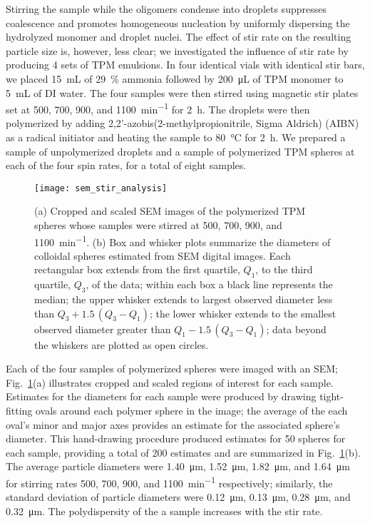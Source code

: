 Stirring the sample while the oligomers condense into droplets suppresses coalescence and
promotes homogeneous nucleation by uniformly dispersing the hydrolyzed monomer and droplet
nuclei. %
The effect of stir rate on the resulting particle size is, however, less clear;
we investigated the influence of stir rate by producing \num{4} sets of TPM emulsions.
In four identical vials with identical stir bars, we placed \SI{15}{\milli\liter} of 
\SI{29}{\percent} ammonia followed by \SI{200}{\micro\liter} of TPM 
monomer to \SI{5}{\milli\liter} of DI water. The four samples were then stirred 
using magnetic stir plates set at \num{500}, \num{700}, \num{900}, and
\SI{1100}{\minute^{-1}} for \SI{2}{\hour}. 
The droplets were then polymerized by adding
\num{2},\num{2}'-azobis(\num{2}-methylpropionitrile, Sigma Aldrich) (AIBN)
as a radical initiator and %
heating the sample to \SI{80}{\celsius} for \SI{2}{\hour}.
We prepared a sample of unpolymerized droplets and a sample of polymerized TPM spheres
at each of the four spin rates, for a total of eight samples.

\begin{figure}
    \centering
    \texttt{[image: sem\_stir\_analysis]}
    \caption{(a) Cropped and scaled SEM images of the polymerized TPM spheres whose
      samples were stirred at \num{500}, \num{700}, \num{900}, and \SI{1100}{\minute^{-1}}.
      (b)  Box and whisker plots summarize the diameters of colloidal spheres estimated from
      SEM digital images. Each rectangular box extends from the first quartile, $Q_1$, to
      the third quartile, $Q_3$, of the data; within each box a black line represents the median;
      the upper whisker extends to largest observed diameter less than $Q_3 + 1.5\, (Q_3 - Q_1)$;
      the lower whisker extends to the smallest observed diameter greater than $Q_1 - 1.5\, (Q_3 - Q_1)$;
      data beyond the whiskers are plotted as open circles. }
    \label{fig:sem_stir_rate}
\end{figure}

Each of the four samples of polymerized spheres were imaged with an SEM;
Fig.~\ref{fig:sem_stir_rate}(a) illustrates cropped and scaled regions of interest
for each sample. Estimates for the diameters for each sample
were produced by drawing tight-fitting ovals around each polymer sphere in the image;
the average of the each oval's minor and major axes provides an estimate for the
associated sphere's diameter. This hand-drawing procedure produced estimates
for \num{50} spheres for each sample, providing a total of \num{200} estimates
and are summarized in Fig.~\ref{fig:sem_stir_rate}(b).
The average particle diameters were \SI{1.40}{\um}, \SI{1.52}{\um},
\SI{1.82}{\um}, and \SI{1.64}{\um} for stirring rates \num{500}, \num{700}, \num{900}, and
\SI{1100}{\minute^{-1}} respectively; similarly, the standard deviation of particle diameters
were \SI{0.12}{\um}, \SI{0.13}{\um}, \SI{0.28}{\um}, and \SI{0.32}{\um}.
The polydispersity of the a sample increases with the stir rate.

